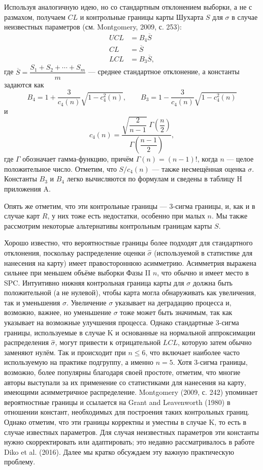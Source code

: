 Используя аналогичную идею, но со стандартным отклонением выборки, а не с размахом, получаем \(CL\) и контрольные границы карты Шухарта \(S\) для \(\sigma\) в случае неизвестных параметров (см. Montgomery, 2009, с. 253):
\begin{equation}
	\begin{aligned}
		UCL &= B_4\overline{S} \\
		CL &= \overline{S} \\
		LCL &= B_3\overline{S},
	\end{aligned}
	\label{eq:3.33}
\end{equation}
где \(\overline{S} = \dfrac{S_1 + S_2 + \cdots + S_m}{m}\) — среднее стандартное отклонение, а константы задаются как
\[
	B_4 = 1 + \frac{3}{c_4(n)}\sqrt{1 - c_4^2(n)}, \qquad
	B_3 = 1 - \frac{3}{c_4(n)}\sqrt{1 - c_4^2(n)}
\]
и
\[
	c_4(n) = \frac{\sqrt{\dfrac{2}{n-1}}\;\Gamma\!\left(\dfrac{n}{2}\right)}{\Gamma\!\left(\dfrac{n-1}{2}\right)},
\]
где \(\Gamma\) обозначает гамма-функцию, причём \(\Gamma(n) = (n - 1)!\), когда \(n\) — целое положительное число. Отметим, что \(S/c_4(n)\) — также несмещённая оценка \(\sigma\). Константы \(B_3\) и \(B_4\) легко вычисляются по формулам и сведены в таблицу H приложения A.

Опять же отметим, что эти контрольные границы — 3-сигма границы, и, как и в случае карт \(R\), у них тоже есть недостатки, особенно при малых \(n\). Мы также рассмотрим некоторые альтернативы контрольным границам карты \(S\).

Хорошо известно, что вероятностные границы более подходят для стандартного отклонения, поскольку распределение оценки \(\hat{\sigma}\) (используемой в статистике для нанесения на карту) имеет правостороннюю асимметрию. Асимметрия выражена сильнее при меньшем объёме выборки Фазы II \(n\), что обычно и имеет место в SPC. Интуитивно нижняя контрольная граница карты для \(\sigma\) должна быть положительной (а не нулевой), чтобы карта могла обнаруживать как увеличения, так и уменьшения \(\sigma\). Увеличение \(\sigma\) указывает на деградацию процесса и, возможно, важнее, но уменьшение \(\sigma\) тоже может быть значимым, так как указывает на возможные улучшения процесса. Однако стандартные 3-сигма границы, используемые в случае K и основанные на нормальной аппроксимации распределения \(\hat{\sigma}\), могут привести к отрицательной \(LCL\), которую затем обычно заменяют нулём. Так и происходит при \(n \le 6\), что включает наиболее часто используемую на практике подгруппу, а именно \(n = 5\). Хотя 3-сигма границы, возможно, более популярны благодаря своей простоте, отметим, что многие авторы выступали за их применение со статистиками для нанесения на карту, имеющими асимметричное распределение. Montgomery (2009, с. 242) упоминает вероятностные границы и ссылается на Grant and Leavenworth (1980) в отношении констант, необходимых для построения таких контрольных границ. Однако отметим, что эти границы корректны и уместны в случае K, то есть в случае известных параметров. Для случая неизвестных параметров эти константы нужно скорректировать или адаптировать; это недавно рассматривалось в работе Diko et al. (2016). Далее мы кратко обсуждаем эту важную практическую проблему.

